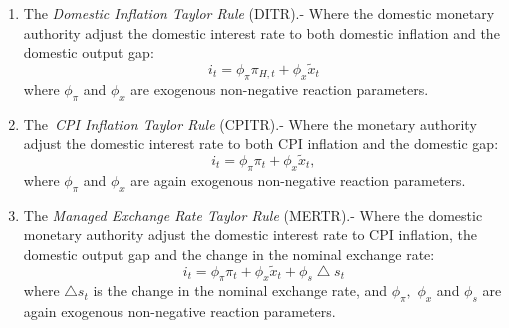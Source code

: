 \documentclass[11pt]{article}
\begin{document}
\begin{enumerate}
\item The \textit{Domestic Inflation Taylor Rule} (DITR).- Where the
domestic monetary authority adjust the domestic interest rate to both
domestic inflation and the domestic output gap:%
\begin{equation}
i_{t}=\phi _{\pi }\pi _{H,t}+\phi _{x}\widetilde{x}_{t}  \label{DITR}
\end{equation}%
where $\phi _{\pi }$ and $\phi _{x}$ are exogenous non-negative reaction
parameters.

\item The\textit{\ CPI Inflation Taylor Rule} (CPITR).- Where the monetary
authority adjust the domestic interest rate to both CPI inflation and the
domestic gap:%
\begin{equation}
i_{t}=\phi _{\pi }\pi _{t}+\phi _{x}\widetilde{x}_{t},  \label{CPITR}
\end{equation}%
where $\phi _{\pi }$ and $\phi _{x}$ are again exogenous non-negative
reaction parameters.

\item The \textit{Managed Exchange Rate Taylor Rule} (MERTR).- Where the
domestic monetary authority adjust the domestic interest rate to CPI
inflation, the domestic output gap and the change in the nominal exchange
rate:%
\begin{equation}
i_{t}=\phi _{\pi }\pi _{t}+\phi _{x}\widetilde{x}_{t}+\phi
_{s}\bigtriangleup s_{t}  \label{MERTR}
\end{equation}%
where $\bigtriangleup s_{t}$ is the change in the nominal exchange rate, and 
$\phi _{\pi },$ $\phi _{x}$ and $\phi _{s}$ are again exogenous non-negative
reaction parameters.


\end{enumerate}
\end{document}
